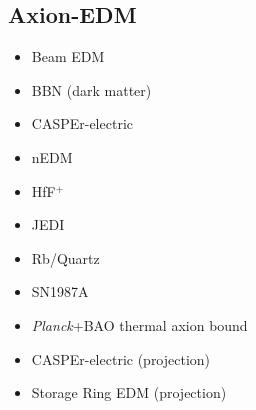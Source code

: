 \documentclass[9pt,twocolumn]{extarticle}
\begin{document}
\begin{mdframed}
\vspace{-1em}
\section{Axion-EDM}\vspace{-0.5em}
\begin{itemize}\setlength\itemsep{-0.5em}
	\item Beam EDM~\cite{Schulthess:2022pbp}
		\item BBN (dark matter)~\cite{Blum:2014vsa}
	\item CASPEr-electric~\cite{Aybas:2021nvn}
	\item nEDM~\cite{Abel:2017rtm}
	\item HfF$^+$~\cite{Roussy:2020ily}
	\item JEDI~\cite{JEDI:2022hxa}
	\item Rb/Quartz~\cite{Zhang:2022ewz}
	\item SN1987A~\cite{Lucente:2022vuo}
	\item \emph{Planck}+BAO thermal axion bound~\cite{Caloni:2022uya}
	\item CASPEr-electric (projection)~\cite{JacksonKimball:2017elr}	
	\item Storage Ring EDM (projection)~\cite{JacksonKimball:2017elr}	
	
\end{itemize}
\end{mdframed}
\end{document}

